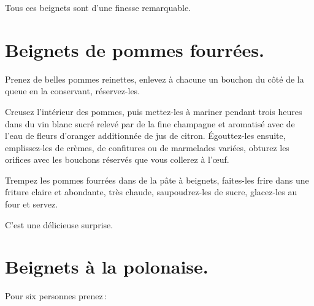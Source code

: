 Tous ces beignets sont d'une finesse remarquable.


\section*{\centering Beignets de pommes fourrées.}
{}

Prenez de belles pommes reinettes, enlevez à chacune un bouchon du côté de la
queue en la conservant, réservez-les.

Creusez l'intérieur des pommes, puis mettez-les à mariner pendant trois heures
dans du vin blanc sucré relevé par de la fine champagne et aromatisé avec de
l’eau de fleurs d'oranger additionnée de jus de citron. Égouttez-les ensuite,
emplissez-les de crèmes, de confitures ou de marmelades variées, obturez les
orifices avec les bouchons réservés que vous collerez à l'œuf.

Trempez les pommes fourrées dans de la pâte à beignets, faites-les frire dans
une friture claire et abondante, très chaude, saupoudrez-les de sucre,
glacez-les au four et servez.

C'est une délicieuse surprise.

\section*{\centering Beignets à la polonaise.}
{}

Pour six personnes prenez :

